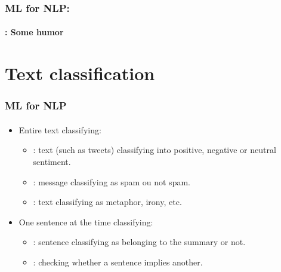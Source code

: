\documentclass[xcolor=table]{beamer}
\begin{document}
	\begin{frame}
		\frametitle{ML for NLP: \insertsection}
		\framesubtitle{\insertsubsection: Some humor}
		
		\begin{center}
		\end{center}
		
	\end{frame}
	
	
	\section{Text classification}
	
	\begin{frame}
		\frametitle{ML for NLP}
		\framesubtitle{\insertsection}
		
		\begin{itemize}
			\item Entire text classifying:
			\begin{itemize}
				\item {}: text (such as tweets) classifying into positive, negative or neutral sentiment.
				\item {}: message classifying as spam ou not spam.
				\item {}: text classifying as metaphor, irony, etc.
			\end{itemize}
			\item One sentence at the time classifying:
			\begin{itemize}
				\item {}: sentence classifying as belonging to the summary or not.
				\item {}: checking whether a sentence implies another.
			\end{itemize}
		\end{itemize}
		
	\end{frame}
	
\end{document}
